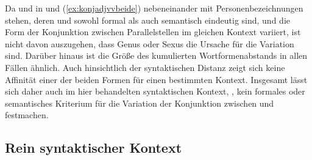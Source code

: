 \begin{exe}
	
\end{exe}

Da  und  in  und
(\ref{ex:konjadjvvbeide}) nebeneinander mit Personenbezeichnungen stehen, deren
 und  sowohl formal als auch semantisch eindeutig sind,
und die Form der Konjunktion zwischen Parallelstellen im
gleichen Kontext variiert, ist nicht davon auszugehen, dass Genus oder
Sexus die Ursache für die Variation sind. Darüber hinaus ist die Größe des
kumulierten Wortformenabstands in allen Fällen ähnlich.
Auch hinsichtlich der syntaktischen Distanz zeigt sich
keine Affinität einer der beiden Formen für einen bestimmten Kontext. Insgesamt
lässt sich daher auch im hier behandelten syntaktischen Kontext,
, kein formales oder semantisches Kriterium
für die Variation der Konjunktion zwischen  und 
festmachen.


\subsection{Rein syntaktischer Kontext}
\label{subsec:kcbeidquantsyncont}

